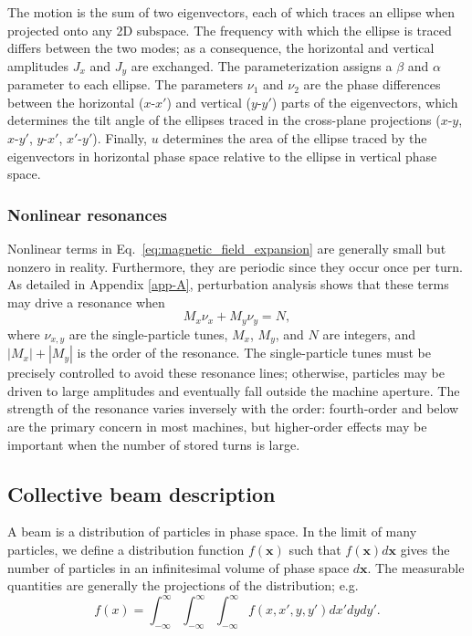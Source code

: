 %
The motion is the sum of two eigenvectors, each of which traces an ellipse when projected onto any 2D subspace. The frequency with which the ellipse is traced differs between the two modes; as a consequence, the horizontal and vertical amplitudes $J_x$ and $J_y$ are exchanged. The parameterization assigns a $\beta$ and $\alpha$ parameter to each ellipse. The parameters $\nu_1$ and $\nu_2$ are the phase differences between the horizontal ($x$-$x'$) and vertical ($y$-$y'$) parts of the eigenvectors, which determines the tilt angle of the ellipses traced in the cross-plane projections ($x$-$y$, $x$-$y'$, $y$-$x'$, $x'$-$y'$). Finally, $u$ determines the area of the ellipse traced by the eigenvectors in horizontal phase space relative to the ellipse in vertical phase space. 


\subsubsection{Nonlinear resonances}

Nonlinear terms in Eq.~\eqref{eq:magnetic_field_expansion} are generally small but nonzero in reality. Furthermore, they are periodic since they occur once per turn. As detailed in Appendix \ref{app-A}, perturbation analysis shows that these terms may drive a resonance when 
%
\begin{equation}\label{eq:resonance_lines}
    M_x \nu_x + M_y \nu_y = N,
\end{equation}
%
where $\nu_{x, y}$ are the single-particle tunes, $M_x$, $M_y$, and $N$ are integers, and $|M_x| + |M_y|$ is the order of the resonance. The single-particle tunes must be precisely controlled to avoid these resonance lines; otherwise, particles may be driven to large amplitudes and eventually fall outside the machine aperture. The strength of the resonance varies inversely with the order: fourth-order and below are the primary concern in most machines, but higher-order effects may be important when the number of stored turns is large. 



\subsection{Collective beam description}

A beam is a distribution of particles in phase space. In the limit of many particles, we define a distribution function $f(\mathbf{x})$ such that $f(\mathbf{x}) d\mathbf{x}$ gives the number of particles in an infinitesimal volume of phase space $d\mathbf{x}$. The measurable quantities are generally the projections of the distribution; e.g.
%
\begin{equation}
    f(x) = 
    \int_{-\infty}^{\infty}
    \int_{-\infty}^{\infty}
    \int_{-\infty}^{\infty}
    f(x, x', y, y') dx' dy dy'.
\end{equation}
%


